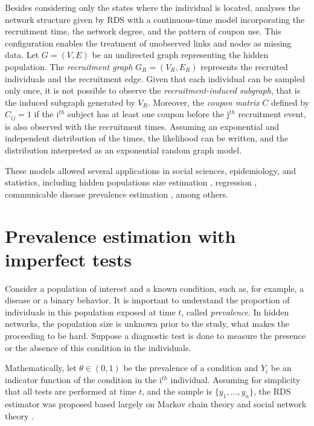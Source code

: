 Besides considering only the states where the individual is located,
\cite{crawford2016} analyses the network structure given by RDS with a
continuous-time model incorporating the recruitment time, the network degree,
and the pattern of coupon use. This configuration enables the treatment of
unobserved links and nodes as missing data. Let $G = (V,E)$ be an undirected
graph representing the hidden population. The {\em recruitment graph} $G_R =
(V_R, E_R)$ represents the recruited individuals and the recruitment edge.
Given that each individual can be sampled only once, it is not possible to
observe the {\em recruitment-induced subgraph}, that is the induced subgraph
generated by $V_R$. Moreover, the {\em coupon matrix} $C$ defined by $C_{ij} =
1$ if the i$^{th}$ subject has at least one coupon before the j$^{th}$
recruitment event, is also observed with the recruitment times. Assuming an
exponential and independent distribution of the times, the likelihood can be
written, and the distribution interpreted as an exponential random graph
model. 

These models allowed several applications in social sciences, epidemiology,
and statistics, including hidden populations size estimation
\cite{crawford2018hidden}, regression \cite{bastos2012binary}, communicable
disease prevalence estimation \cite{albuquerque2009avaliaccao}, among others. 

\section{Prevalence estimation with imperfect tests}

Consider a population of interest and a known condition, such as, for example,
a disease or a binary behavior. It is important to understand the proportion
of individuals in this population exposed at time $t$, called {\em
prevalence}. In hidden networks, the population size is unknown prior to the
study, what makes the proceeding to be hard. Suppose a diagnostic test is done to measure the presence or the
absence of this condition in the individuals. 

Mathematically, let $\theta \in (0,1)$ be the prevalence of a condition and
$Y_i$ be an  indicator function of the condition in the i$^{th}$ individual.
Assuming for simplicity that all tests are performed at time $t$, and the
sample is $\{y_1, ..., y_n\}$, the RDS estimator was
proposed based largely on Markov chain theory and social network theory
\cite{heckathorn1997, heckathorn2002}. 

